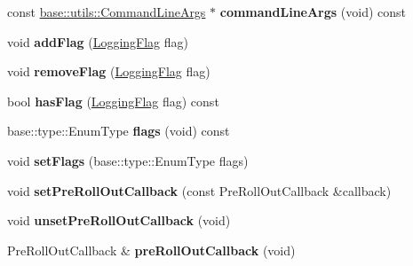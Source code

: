 \begin{DoxyCompactItemize}
const \hyperlink{classel_1_1base_1_1utils_1_1_command_line_args}{base\+::utils\+::\+Command\+Line\+Args} $\ast$ {\bfseries command\+Line\+Args} (void) const
\item 
\mbox{\label{classel_1_1base_1_1_storage_a3e17c61961f3b2f45e8ec77e3320bed5}} 
void {\bfseries add\+Flag} (\hyperlink{namespaceel_a2784aacd04cb7816ac1c0b20fcbf83cb}{Logging\+Flag} flag)
\item 
\mbox{\label{classel_1_1base_1_1_storage_aaecbb6ae954d0bf748ac7f3c980a9173}} 
void {\bfseries remove\+Flag} (\hyperlink{namespaceel_a2784aacd04cb7816ac1c0b20fcbf83cb}{Logging\+Flag} flag)
\item 
\mbox{\label{classel_1_1base_1_1_storage_a20531a7be4a1aae3d5233a5aec3eb520}} 
bool {\bfseries has\+Flag} (\hyperlink{namespaceel_a2784aacd04cb7816ac1c0b20fcbf83cb}{Logging\+Flag} flag) const
\item 
\mbox{\label{classel_1_1base_1_1_storage_aef58f703540d1cd21942d487ba56a686}} 
base\+::type\+::\+Enum\+Type {\bfseries flags} (void) const
\item 
\mbox{\label{classel_1_1base_1_1_storage_a5df88c56b8d923c20568e50ceb0bdd64}} 
void {\bfseries set\+Flags} (base\+::type\+::\+Enum\+Type flags)
\item 
\mbox{\label{classel_1_1base_1_1_storage_a626165bc5c8808b733707294ce2a0dc8}} 
void {\bfseries set\+Pre\+Roll\+Out\+Callback} (const Pre\+Roll\+Out\+Callback \&callback)
\item 
\mbox{\label{classel_1_1base_1_1_storage_a2bfdc3a20eeafe158ee8603c805131e4}} 
void {\bfseries unset\+Pre\+Roll\+Out\+Callback} (void)
\item 
\mbox{\label{classel_1_1base_1_1_storage_a90a3a886437746acae51cacbd5731572}} 
Pre\+Roll\+Out\+Callback \& {\bfseries pre\+Roll\+Out\+Callback} (void)
\item 
\mbox{\label{classel_1_1base_1_1_storage_ae953cb6e8acafa96c5c1ab2f4826a4a5}} 

\end{DoxyCompactItemize}
